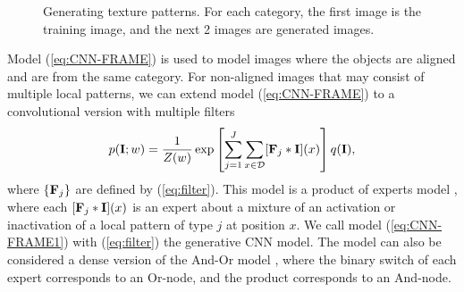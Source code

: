 \documentclass[letterpaper]{article}
\def\I{{\bf I}}
\def\F{{\bf F}}
\begin{document}
\begin{figure}
%	
	\caption{Generating texture patterns. For each category, the first image is the training image, and the next 2 images are generated images. }
	\label{fig:texture}
\end{figure}




Model (\ref{eq:CNN-FRAME}) is used to model images where the objects are aligned and are from the same category. For non-aligned images that may consist of multiple local patterns, we can extend model (\ref{eq:CNN-FRAME}) to a convolutional version with multiple filters
\begin{eqnarray}
   p(\I; w) = \frac{1}{Z(w)} \exp \left[\sum_{j=1}^{J} \sum_{x \in {\cal D}} [\F_j*\I](x)\right] q(\I), 
   \label{eq:CNN-FRAME1}
\end{eqnarray}
where $\{\F_j\}$ are defined by (\ref{eq:filter}). This model is a product of experts model \citep{Hinton2002a}, where each  $[\F_j*\I](x)$ is an expert about a mixture of an activation or inactivation of a local pattern of type $j$ at position $x$.  We call model (\ref{eq:CNN-FRAME1}) with (\ref{eq:filter}) the generative CNN model. The model can also be considered a dense version of the And-Or model \citep{ZhuM06}, where the binary switch of each expert corresponds to an Or-node, and the product corresponds to an And-node. 
\end{document}
